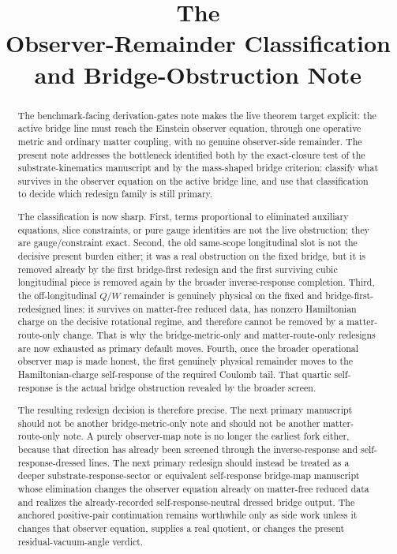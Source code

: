 \documentclass[11pt]{article}
\title{\textbf{The \TheoryName{}}\\[0.4em]
\large Observer-Remainder Classification and Bridge-Obstruction Note}
\author{}
\date{}
\begin{document}
\maketitle

\begin{abstract}
The benchmark-facing derivation-gates note makes the live theorem target explicit: the active bridge line must reach the Einstein observer equation, through one operative metric and ordinary matter coupling, with no genuine observer-side remainder. The present note addresses the bottleneck identified both by the exact-closure test of the substrate-kinematics manuscript and by the mass-shaped bridge criterion: classify what survives in the observer equation on the active bridge line, and use that classification to decide which redesign family is still primary.

The classification is now sharp. First, terms proportional to eliminated auxiliary equations, slice constraints, or pure gauge identities are not the live obstruction; they are gauge/constraint exact. Second, the old same-scope longitudinal slot is not the decisive present burden either; it was a real obstruction on the fixed bridge, but it is removed already by the first bridge-first redesign and the first surviving cubic longitudinal piece is removed again by the broader inverse-response completion. Third, the off-longitudinal \(Q/W\) remainder is genuinely physical on the fixed and bridge-first-redesigned lines: it survives on matter-free reduced data, has nonzero Hamiltonian charge on the decisive rotational regime, and therefore cannot be removed by a matter-route-only change. That is why the bridge-metric-only and matter-route-only redesigns are now exhausted as primary default moves. Fourth, once the broader operational observer map is made honest, the first genuinely physical remainder moves to the Hamiltonian-charge self-response of the required Coulomb tail. That quartic self-response is the actual bridge obstruction revealed by the broader screen.

The resulting redesign decision is therefore precise. The next primary manuscript should not be another bridge-metric-only note and should not be another matter-route-only note. A purely observer-map note is no longer the earliest fork either, because that direction has already been screened through the inverse-response and self-response-dressed lines. The next primary redesign should instead be treated as a deeper substrate-response-sector or equivalent self-response bridge-map manuscript whose elimination changes the observer equation already on matter-free reduced data and realizes the already-recorded self-response-neutral dressed bridge output. The anchored positive-pair continuation remains worthwhile only as side work unless it changes that observer equation, supplies a real quotient, or changes the present residual-vacuum-angle verdict.
\end{abstract}
\end{document}
